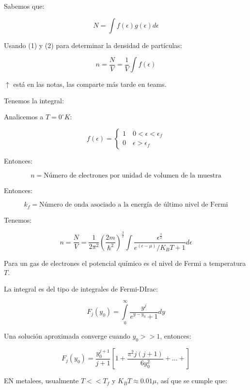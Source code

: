 \documentclass{article}
\begin{document}
Sabemos que:



\[ N = \int\limits f(\epsilon) g(\epsilon)d\epsilon \]


Usando (1) y (2) para determinar la densidad de partículas:

\[  n = \frac{N}{V} = \frac{1}{V} \int\limits f(\epsilon)   \]


$\uparrow$ está en las notas, las comparte más tarde en teams.




Tenemos la integral:

Analicemos a $T=0 ^{\circ}K$:


\[ f(\epsilon) =  \left\{ \begin{array}{l}
1 \quad 0< \epsilon<\epsilon_{f}\\
0 \quad \epsilon>\epsilon_{f}
\end{array}\right.   \]


Entonces:


\[ n = \text{Número de electrones por unidad de volumen de la muestra} \]



Entonces:



\[  k_{f} = \text{Número de onda asociado a la energía de último nivel de Fermi} \]


Tenemos:

\[ n = \frac{N}{V} = \frac{1}{2\pi^{2}} \left( \frac{2m}{\hbar^{2}}   \right)^{\frac{3}{2}} \int\limits \frac{ \epsilon^{\frac{1}{2}}  }{  e^{  (\epsilon - \mu) } /K_{B}T + 1   } d\epsilon  \]





Para un gas de electrones el potencial químico es el nivel de Fermi a temperatura $T$. 


 La integral es del tipo de integrales de Fermi-DIrac: 


\[F_{j}(y_{0})  = \int\limits_{0}^{\infty}   \frac{ y^{j}  }{  e^{y-y_{0}}  +1}  dy    \]


Una solución aproximada converge cuando $y_{0}>>1$, entonces:



\[ F_{j}(y_{0}) = \frac{ y_{0}^{j+1}  }{j+1}  \left[ 1 + \frac{ \pi^{2}j(j+1)  }{6y_{0}^{2}}  + \ldots + \right] \]




EN metalees, usualmente $T<<T_{f}$ y $K_{B}T \approx 0\text{.}01\mu$, así que se cumple que:
\end{document}
